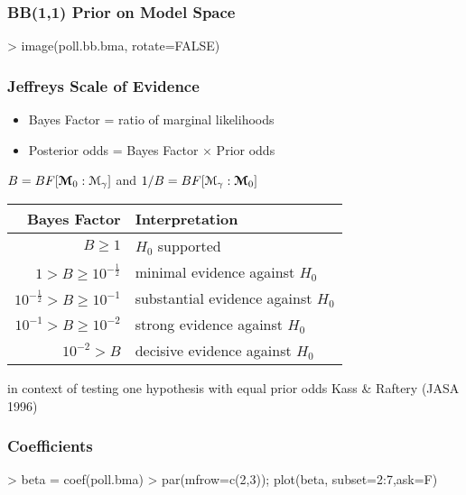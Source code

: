 \documentclass[]{beamer}
\begin{document}
\begin{frame}\frametitle{BB(1,1) Prior on Model Space}


\begin{Schunk}
\begin{Sinput}
> image(poll.bb.bma, rotate=FALSE)
\end{Sinput}
\end{Schunk}

\end{frame}
\begin{frame}
\frametitle{Jeffreys Scale of Evidence}
\begin{itemize}
\item Bayes Factor = ratio of marginal likelihoods \pause

\item Posterior odds = Bayes Factor $\times$ Prior odds \pause

\end{itemize}


$B = BF[\boldsymbol{{\cal M}}_0 : {\cal M}_\gamma]$   and $1/B = BF[{\cal M}_\gamma : \boldsymbol{{\cal M}}_0]$ \pause

\vspace{14pt}

\begin{tabular}{|r|l|} \hline \hline
Bayes Factor & Interpretation \\ \hline
$B \geq 1$ & $H_0$ supported \\
$1 > B \geq 10^{-\frac{1}{2}} $ & minimal evidence against $H_0$ \\
$ 10^{- \frac{1}{2}} > B  \geq 10^{-1}$ & substantial evidence against $H_0$ \\
$ 10^{-1} > B  \geq 10^{-2}$ & strong evidence against $H_0$ \\
$ 10^{-2} > B $ & decisive evidence against $H_0$ \\ \hline \hline
\end{tabular}

\pause
\vspace{24pt}
in context of testing one hypothesis with equal prior odds
Kass \& Raftery (JASA 1996)
\end{frame}


\begin{frame}[fragile]
\frametitle{Coefficients}
\begin{Schunk}
\begin{Sinput}
>  beta = coef(poll.bma)
>  par(mfrow=c(2,3));  plot(beta, subset=2:7,ask=F)
\end{Sinput}
\end{Schunk}

\end{frame}
\end{document}
